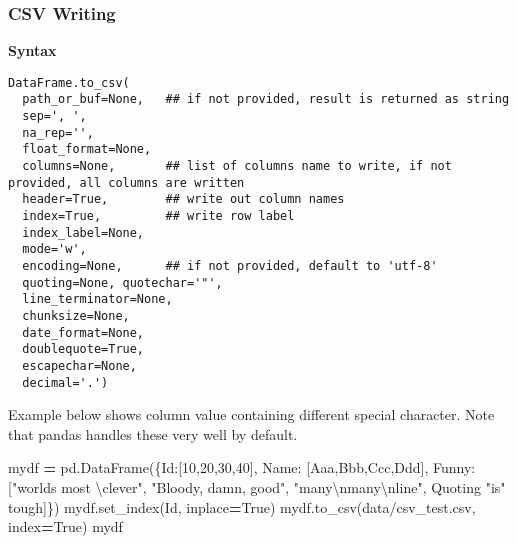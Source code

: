 \documentclass[
]{book}
\newenvironment{Shaded}{\begin{snugshade}}{\end{snugshade}}
\newcommand{\CharTok}[1]{\textcolor[rgb]{0.5,0.5,0.5}{#1}}
\newcommand{\DecValTok}[1]{\textcolor[rgb]{0.06,0.06,0.06}{#1}}
\newcommand{\NormalTok}[1]{#1}
\newcommand{\OperatorTok}[1]{\textcolor[rgb]{0.43,0.43,0.43}{\textbf{#1}}}
\newcommand{\StringTok}[1]{\textcolor[rgb]{0.5,0.5,0.5}{#1}}
\newcommand{\VariableTok}[1]{\textcolor[rgb]{0,0,0}{#1}}
\begin{document}
\hypertarget{csv-writing}{%
\subsubsection{CSV Writing}\label{csv-writing}}

\textbf{Syntax}

\begin{verbatim}
DataFrame.to_csv(
  path_or_buf=None,   ## if not provided, result is returned as string
  sep=', ', 
  na_rep='', 
  float_format=None, 
  columns=None,       ## list of columns name to write, if not provided, all columns are written
  header=True,        ## write out column names
  index=True,         ## write row label
  index_label=None, 
  mode='w', 
  encoding=None,      ## if not provided, default to 'utf-8'
  quoting=None, quotechar='"', 
  line_terminator=None, 
  chunksize=None, 
  date_format=None, 
  doublequote=True, 
  escapechar=None, 
  decimal='.')
\end{verbatim}

Example below shows column value containing different special character. Note that pandas handles these very well by default.

\begin{Shaded}
\begin{Highlighting}[]
\NormalTok{mydf }\OperatorTok{=}\NormalTok{ pd.DataFrame(\{}\StringTok{\textquotesingle{}Id\textquotesingle{}}\NormalTok{:[}\DecValTok{10}\NormalTok{,}\DecValTok{20}\NormalTok{,}\DecValTok{30}\NormalTok{,}\DecValTok{40}\NormalTok{], }
                     \StringTok{\textquotesingle{}Name\textquotesingle{}}\NormalTok{:  [}\StringTok{\textquotesingle{}Aaa\textquotesingle{}}\NormalTok{,}\StringTok{\textquotesingle{}Bbb\textquotesingle{}}\NormalTok{,}\StringTok{\textquotesingle{}Ccc\textquotesingle{}}\NormalTok{,}\StringTok{\textquotesingle{}Ddd\textquotesingle{}}\NormalTok{],}
                     \StringTok{\textquotesingle{}Funny\textquotesingle{}}\NormalTok{: [}\StringTok{"world\textquotesingle{}s most \textbackslash{}clever"}\NormalTok{, }
                     \StringTok{"Bloody, damn, good"}\NormalTok{, }
                     \StringTok{"many}\CharTok{\textbackslash{}n}\StringTok{many}\CharTok{\textbackslash{}n}\StringTok{line"}\NormalTok{, }
                     \StringTok{\textquotesingle{}Quoting "is" tough\textquotesingle{}}\NormalTok{]\})}
\NormalTok{mydf.set\_index(}\StringTok{\textquotesingle{}Id\textquotesingle{}}\NormalTok{, inplace}\OperatorTok{=}\VariableTok{True}\NormalTok{)}
\NormalTok{mydf.to\_csv(}\StringTok{\textquotesingle{}data/csv\_test.csv\textquotesingle{}}\NormalTok{, index}\OperatorTok{=}\VariableTok{True}\NormalTok{)}
\NormalTok{mydf}
\end{Highlighting}
\end{Shaded}
\end{document}
